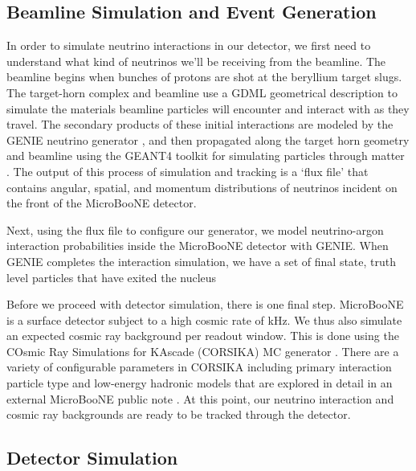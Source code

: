\subsection{Beamline Simulation and Event Generation}
In order to simulate neutrino interactions in our detector, we first need to understand what kind of neutrinos we'll be receiving from the beamline. The beamline begins when bunches of protons are shot at the beryllium target slugs. The target-horn complex and beamline use a GDML geometrical description \cite{bib:gdml} to simulate the materials beamline particles will encounter and interact with as they travel.  The secondary products of these initial interactions are modeled by the GENIE neutrino generator \cite{bib:genie}, and then propagated along the target horn geometry and beamline using the GEANT4 toolkit for simulating particles through matter \cite{bib:geant4}. The output of this process of simulation and tracking is a `flux file' that contains angular, spatial, and momentum distributions of neutrinos incident on the front of the MicroBooNE detector.  
\par Next, using the flux file to configure our generator, we model neutrino-argon interaction probabilities inside the MicroBooNE detector with GENIE.  When GENIE completes the interaction simulation, we have a set of final state, truth level particles that have exited the nucleus  
\par Before we proceed with detector simulation, there is one final step.  MicroBooNE is a surface detector subject to a high cosmic rate of kHz.  We thus also simulate an expected cosmic ray background per readout window. This is done using the COsmic Ray Simulations for KAscade (CORSIKA) MC generator \cite{bib:corsika}. There are a variety of configurable parameters in CORSIKA including primary interaction particle type and low-energy hadronic models that are explored in detail in an external MicroBooNE public note \cite{bib:pubnote_cosmic}.   At this point, our neutrino interaction and cosmic ray backgrounds are ready to be tracked through the detector.


\subsection{Detector Simulation}

